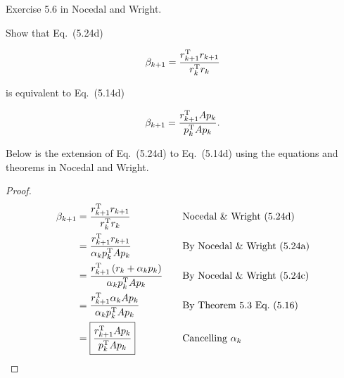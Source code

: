 \begin{problem}
  Exercise 5.6 in Nocedal and Wright.

  Show that Eq.~(5.24d) 
  
  \[ \beta_{k+1} = \frac{r_{k+1}^{\textnormal{T}} r_{k+1}}{r_{k}^{\textnormal{T}} r_{k}} \]

  is equivalent to Eq.~(5.14d)

  \[ \beta_{k+1} = \frac{r_{k+1}^{\textnormal{T}} Ap_{k}}{p_{k}^{\textnormal{T}} Ap_{k}} \text{.}\]
\end{problem}


\noindent
Below is the extension of Eq.~(5.24d) to Eq.~(5.14d) using the equations and theorems in Nocedal and Wright.

\begin{proof}
  \begin{alignat*}{2}
    \beta_{k+1} &= \frac{r_{k+1}^{\textnormal{T}} r_{k+1}}{r_{k}^{\textnormal{T}} r_{k}} &\quad &\text{Nocedal \& Wright~(5.24d)} \\
    &= \frac{r_{k+1}^{\textnormal{T}} r_{k+1}}{\alpha_{k}p^{\textnormal{T}}_{k}Ap_{k}} &\quad &\text{By Nocedal \& Wright~(5.24a)} \\
    &= \frac{r_{k+1}^{\textnormal{T}} \left(r_{k} + \alpha_{k}p_{k}\right)}{\alpha_{k}p^{\textnormal{T}}_{k}Ap_{k}} &\quad &\text{By Nocedal \& Wright~(5.24c)} \\
    &= \frac{r_{k+1}^{\textnormal{T}} \alpha_{k}Ap_{k}}{\alpha_{k}p^{\textnormal{T}}_{k}Ap_{k}} &\quad &\text{By Theorem~5.3 Eq.~(5.16)} \\
    &=\boxed{\frac{r^{\textnormal{T}}_{k+1}Ap_{k}}{p^{\textnormal{T}}_{k}Ap_{k}}} &\quad &\text{Cancelling } \alpha_{k}
  \end{alignat*}
\end{proof}
